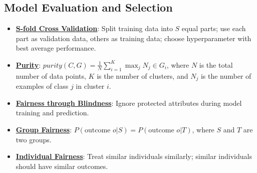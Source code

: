 \documentclass{article}%
\begin{document}
\subsection{Model Evaluation and Selection}%
\label{subsec:ModelEvaluationandSelection}%
\begin{itemize}[leftmargin=*]%
\item \href{https://purdue.brightspace.com/d2l/common/assets/pdfjs-d2l-dist/1.0.14-legacy/web/viewer.html?file=\%2Fcontent\%2Fenforced\%2F1095467-wl.202510.CS.24300.001\%2F10L1-CrossValidation.pdf\%3Fou\%3D1095467\&lang=en-us\&container=d2l-fileviewer-rendered-pdf\&fullscreen=d2l-fileviewer-rendered-pdf-dialog\&height=667#page=25}{\textbf{S-fold Cross Validation}}: Split training data into $S$ equal parts; use each part as validation data, others as training data; choose hyperparameter with best average performance.%
\item \href{https://purdue.brightspace.com/d2l/common/assets/pdfjs-d2l-dist/1.0.14-legacy/web/viewer.html?file=\%2Fcontent\%2Fenforced\%2F1095467-wl.202510.CS.24300.001\%2F12L2-distance-clusters.pdf\%3Fou\%3D1095467\&lang=en-us\&container=d2l-fileviewer-rendered-pdf\&fullscreen=d2l-fileviewer-rendered-pdf-dialog\&height=667#page=44}{\textbf{Purity}}: $purity(C, G) = \frac{1}{N} \sum_{i=1}^{K} \max_{j} N_j \in G_i$, where $N$ is the total number of data points, $K$ is the number of clusters, and $N_j$ is the number of examples of class $j$ in cluster $i$.%
\item \href{https://purdue.brightspace.com/d2l/common/assets/pdfjs-d2l-dist/1.0.14-legacy/web/viewer.html?file=\%2Fcontent\%2Fenforced\%2F1095467-wl.202510.CS.24300.001\%2F16L2-ethics.pdf\%3Fou\%3D1095467\&lang=en-us\&container=d2l-fileviewer-rendered-pdf\&fullscreen=d2l-fileviewer-rendered-pdf-dialog\&height=667#page=25}{\textbf{Fairness through Blindness}}: Ignore protected attributes during model training and prediction.%
\item \href{https://purdue.brightspace.com/d2l/common/assets/pdfjs-d2l-dist/1.0.14-legacy/web/viewer.html?file=\%2Fcontent\%2Fenforced\%2F1095467-wl.202510.CS.24300.001\%2F16L2-ethics.pdf\%3Fou\%3D1095467\&lang=en-us\&container=d2l-fileviewer-rendered-pdf\&fullscreen=d2l-fileviewer-rendered-pdf-dialog\&height=667#page=26}{\textbf{Group Fairness}}: $P(\text{outcome } o | S) = P(\text{outcome } o | T)$, where $S$ and $T$ are two groups.%
\item \href{https://purdue.brightspace.com/d2l/common/assets/pdfjs-d2l-dist/1.0.14-legacy/web/viewer.html?file=\%2Fcontent\%2Fenforced\%2F1095467-wl.202510.CS.24300.001\%2F16L2-ethics.pdf\%3Fou\%3D1095467\&lang=en-us\&container=d2l-fileviewer-rendered-pdf\&fullscreen=d2l-fileviewer-rendered-pdf-dialog\&height=667#page=27}{\textbf{Individual Fairness}}: Treat similar individuals similarly; similar individuals should have similar outcomes.%

\end{itemize}
\end{document}

